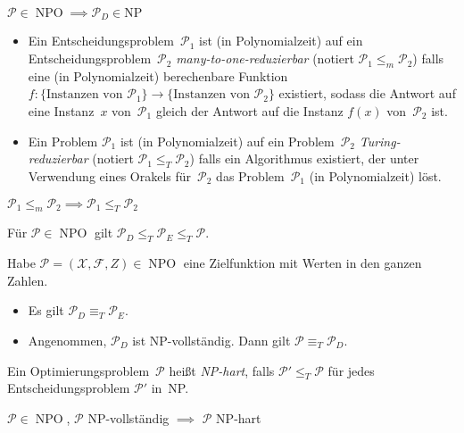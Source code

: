 \documentclass{cheat-sheet}
\newcommand{\Instances}{\mathcal{X}} %
\newcommand{\Feasible}{\mathcal{F}} %
\newcommand{\ObjFun}{Z} %
\newcommand{\OptTuple}{(\Instances{}, \Feasible{}, \ObjFun{})} %
\DeclareMathOperator{\NPO}{NPO} %
\newcommand{\Prob}{\mathcal{P}} %
\newcommand{\ManyOneRed}{\leq_m} %
\newcommand{\TuringRed}{\leq_T} %
\newcommand{\TuringEq}{\equiv_T} %
\begin{document}
\begin{defn}
  $\Prob \in \NPO \implies \Prob_D \in \mathrm{NP}$
\end{defn}

\begin{defn}
  \begin{itemize}
    \item Ein Entscheidungsproblem~$\Prob_1$ ist (in Polynomialzeit) auf ein Entscheidungsproblem~$\Prob_2$ \emph{many-to-one-reduzierbar} (notiert $\Prob_1 \ManyOneRed \Prob_2$) falls eine (in Polynomialzeit) berechenbare Funktion $f : \{ \text{Instanzen von~$\Prob_1$} \} \to \{ \text{Instanzen von~$\Prob_2$} \}$ existiert, sodass die Antwort auf eine Instanz~$x$ von~$\Prob_1$ gleich der Antwort auf die Instanz $f(x)$ von~$\Prob_2$ ist.
    \item Ein Problem $\Prob_1$ ist (in Polynomialzeit) auf ein Problem~$\Prob_2$ \emph{Turing-reduzierbar} (notiert $\Prob_1 \TuringRed \Prob_2$) falls ein Algorithmus existiert, der unter Verwendung eines Orakels für~$\Prob_2$ das Problem~$\Prob_1$ (in Polynomialzeit) löst.
  \end{itemize}
\end{defn}

\begin{beob}
  $
    \Prob_1 \ManyOneRed \Prob_2 \implies
    \Prob_1 \TuringRed \Prob_2
  $
\end{beob}

\begin{beob}
  Für $\Prob \in \NPO$ gilt $\Prob_D \TuringRed \Prob_E \TuringRed \Prob$.
\end{beob}

\begin{satz}
  Habe $\Prob = \OptTuple \in \NPO$ eine Zielfunktion mit Werten in den ganzen Zahlen.
  \begin{itemize}
    \item Es gilt $\Prob_D \TuringEq \Prob_E$.
    \item Angenommen, $\Prob_D$ ist NP-vollständig. Dann gilt $\Prob \TuringEq \Prob_D$.
  \end{itemize}
\end{satz}

\begin{defn}
  Ein Optimierungsproblem~$\Prob$ heißt \emph{NP-hart}, falls $\Prob' \TuringRed \Prob$ für jedes Entscheidungsproblem $\Prob'$ in~NP.
\end{defn}

\begin{beob}
  $\Prob \in \NPO$, $\Prob$ NP-vollständig $\implies$ $\Prob$ NP-hart
\end{beob}
\end{document}
